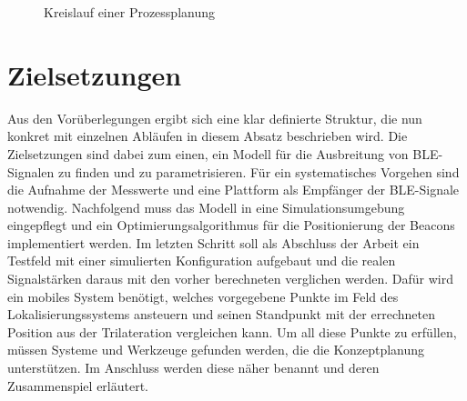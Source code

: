 \begin{figure}[H]
\centering
{}
\caption{Kreislauf einer Prozessplanung}
\label{fig:Prozessplanung}
\end{figure}
\section{Zielsetzungen}
Aus den Vorüberlegungen ergibt sich eine klar definierte Struktur, die nun konkret mit einzelnen Abläufen in diesem Absatz beschrieben wird. Die Zielsetzungen sind dabei zum einen, ein Modell für die Ausbreitung von BLE-Signalen zu finden und zu parametrisieren. Für ein systematisches Vorgehen sind die Aufnahme der Messwerte und eine Plattform als Empfänger der BLE-Signale notwendig. Nachfolgend muss das Modell in eine Simulationsumgebung eingepflegt und ein Optimierungsalgorithmus für die Positionierung der Beacons implementiert werden. Im letzten Schritt soll als Abschluss der Arbeit ein Testfeld mit einer simulierten Konfiguration aufgebaut und die realen Signalstärken daraus mit den vorher berechneten verglichen werden. Dafür wird ein mobiles System benötigt, welches vorgegebene Punkte im Feld des Lokalisierungssystems ansteuern und seinen Standpunkt mit der errechneten Position aus der Trilateration vergleichen kann. Um all diese Punkte zu erfüllen, müssen Systeme und Werkzeuge gefunden werden, die die Konzeptplanung unterstützen. Im Anschluss werden diese näher benannt und deren Zusammenspiel erläutert.
